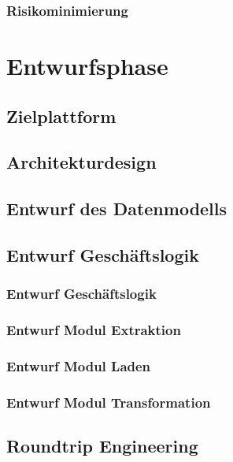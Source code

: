 \documentclass[11pt,toc=sectionentrywithoutdots, headheight=44pt, headings=optiontoheadandtoc]{scrartcl}
\begin{document}
\subsubsection{Risikominimierung}
\blindtext

\section{Entwurfsphase}
\blindtext

\subsection{Zielplattform}
\blindtext

\subsection{Architekturdesign}
\blindtext

\subsection{Entwurf des Datenmodells}
\blindtext

\subsection{Entwurf Geschäftslogik}
\blindtext

\subsubsection{Entwurf Geschäftslogik}
\blindtext

\subsubsection{Entwurf Modul Extraktion}
\blindtext

\subsubsection{Entwurf Modul Laden}
\blindtext

\subsubsection{Entwurf Modul Transformation}
\blindtext

\subsection{Roundtrip Engineering}
\blindtext
\end{document}
